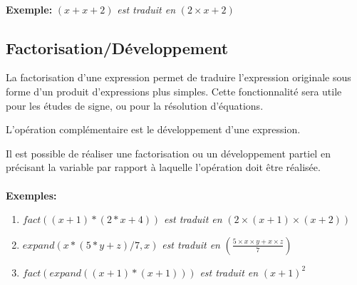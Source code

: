 \documentclass[french,12pt]{report}
\begin{document}
\paragraph{}
{\bf Exemple: }
\begin{math}
  (x + x + 2)
\end{math}
{\it  est traduit en } 
\begin{math}
  (2 \times x + 2)
\end{math}

\subsection{Factorisation/D\'eveloppement}

La  factorisation  d'une expression  permet  de traduire  l'expression
originale sous  forme d'un  produit d'expressions plus  simples. Cette
fonctionnalit\'e sera  utile pour  les \'etudes de  signe, ou  pour la
r\'esolution d'\'equations.

L'op\'eration   compl\'ementaire    est   le   d\'eveloppement   d'une
expression.

Il est possible de  r\'ealiser une factorisation ou un d\'eveloppement
partiel  en   pr\'ecisant  la   variable  par  rapport   \`a  laquelle
l'op\'eration doit \^etre r\'ealis\'ee.
    
\paragraph{}
{\bf Exemples: }
\begin{enumerate}
\item
  \begin{math}
    fact ((x + 1) * (2 * x + 4))
  \end{math}
  {\it  est traduit en }
  \begin{math}
    (2 \times (x + 1) \times (x + 2))
  \end{math}
\item
  \begin{math}
    expand (x * (5 * y + z) / 7, x)
  \end{math}
  {\it  est traduit en }
  \begin{math}
    (\frac{5 \times x \times y + x \times z}{7})
  \end{math}
\item
  \begin{math}
    fact (expand ((x + 1) * (x + 1))) 
  \end{math}
  {\it  est traduit en }
  \begin{math}
    (x + 1)^{2}
  \end{math}
\end{enumerate}
\end{document}
